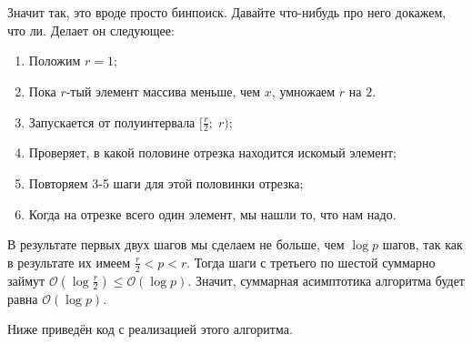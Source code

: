 \section{}

	Значит так, это вроде просто бинпоиск. Давайте что-нибудь про него докажем, что ли. Делает он следующее:
	
	\begin{enumerate}
		\item Положим $r=1$;
		\item Пока $r$-тый элемент массива меньше, чем $x$, умножаем $r$ на $2$. 
		\item Запускается от полуинтервала $[\frac{r}{2};\;r)$;
		\item Проверяет, в какой половине отрезка находится искомый элемент;
		\item Повторяем 3-5 шаги для этой половинки отрезка;
		\item Когда на отрезке всего один элемент, мы нашли то, что нам надо.
	\end{enumerate}

	В результате первых двух шагов мы сделаем не больше, чем $\log p$ шагов, так как в результате их имеем $\frac{r}{2} < p < r$. Тогда шаги с третьего по шестой суммарно займут $\mathcal{O}(\log \frac{r}{2}) \leq \mathcal{O}(\log p)$. Значит, суммарная асимптотика алгоритма будет равна $\mathcal{O}(\log p)$.
	
	Ниже приведён код с реализацией этого алгоритма.

	\newpage